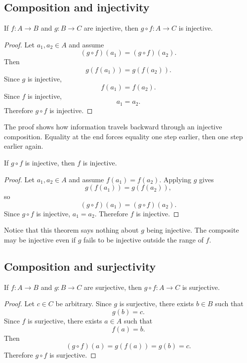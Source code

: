 \subsection{Composition and injectivity}

\begin{theorem}
If $f:A\to B$ and $g:B\to C$ are injective, then $g\circ f:A\to C$ is injective.
\end{theorem}

\begin{proof}
Let $a_1,a_2\in A$ and assume
\[
(g\circ f)(a_1)=(g\circ f)(a_2).
\]
Then
\[
g(f(a_1))=g(f(a_2)).
\]
Since $g$ is injective,
\[
f(a_1)=f(a_2).
\]
Since $f$ is injective,
\[
a_1=a_2.
\]
Therefore $g\circ f$ is injective.
\end{proof}

The proof shows how information travels backward through an injective composition. Equality at the end forces equality one step earlier, then one step earlier again.

\begin{theorem}
If $g\circ f$ is injective, then $f$ is injective.
\end{theorem}

\begin{proof}
Let $a_1,a_2\in A$ and assume $f(a_1)=f(a_2)$. Applying $g$ gives
\[
g(f(a_1))=g(f(a_2)),
\]
so
\[
(g\circ f)(a_1)=(g\circ f)(a_2).
\]
Since $g\circ f$ is injective, $a_1=a_2$. Therefore $f$ is injective.
\end{proof}

Notice that this theorem says nothing about $g$ being injective. The composite may be injective even if $g$ fails to be injective outside the range of $f$.

\subsection{Composition and surjectivity}

\begin{theorem}
If $f:A\to B$ and $g:B\to C$ are surjective, then $g\circ f:A\to C$ is surjective.
\end{theorem}

\begin{proof}
Let $c\in C$ be arbitrary. Since $g$ is surjective, there exists $b\in B$ such that
\[
g(b)=c.
\]
Since $f$ is surjective, there exists $a\in A$ such that
\[
f(a)=b.
\]
Then
\[
(g\circ f)(a)=g(f(a))=g(b)=c.
\]
Therefore $g\circ f$ is surjective.
\end{proof}

